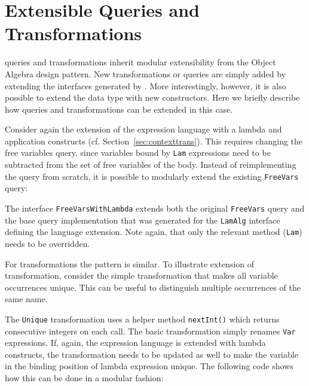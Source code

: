 

\section{Extensible Queries and Transformations}
\label{SECT:extensible}


\noindent \name queries and transformations inherit  modular extensibility from the Object Algebra design pattern.
New transformations or queries are simply added by extending the interfaces generated by \name.
More interestingly, however, it is also possible to extend the data type with new constructors.
Here we briefly describe how queries and transformations can be extended in this case.


Consider again the extension of the expression language with a lambda and application constructs (cf. Section~\ref{sec:contexttrans}).
This requires changing the free variables query, since variables bound by \lstinline{Lam} expressions need to be subtracted from the set of free variables of the body.
Instead of reimplementing the query from scratch, it is possible to modularly extend the existing \lstinline{FreeVars} query:


The interface \lstinline{FreeVarsWithLambda} extends both the original \lstinline{FreeVars} query and the base query implementation that was generated for the \lstinline{LamAlg} interface defining the language extension.
Note again, that only the relevant method (\lstinline{Lam}) needs to be overridden.


For transformations the pattern is similar.
To illustrate extension of transformation, consider the simple transformation that makes all variable occurrences unique.
This can be useful to distinguish multiple occurrences of the same name.


The \lstinline{Unique} transformation uses a helper method \lstinline{nextInt()} which returns consecutive integers on each call.
The basic transformation simply renames \lstinline{Var} expressions.
If, again, the expression language is extended with lambda constructs, the transformation needs to be updated as well to make the variable in the binding position of lambda expression unique.
The following code shows how this can be done in a modular fashion:

